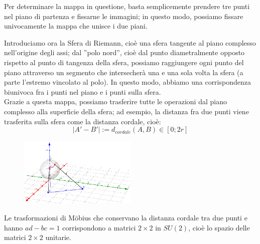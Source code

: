 Per determinare la mappa in questione, basta semplicemente prendere tre punti nel piano di partenza e fissarne le immagini; in questo modo, possiamo fissare univocamente la mappa che unisce i due piani.

Introduciamo ora la Sfera di Riemann, cioè una sfera tangente al piano complesso nell'origine degli assi; dal ''polo nord'', cioè dal punto diametralmente opposto rispetto al punto di  tangenza della sfera, possiamo raggiungere ogni punto del piano attraverso un segmento che intersecherà una e una sola volta la sfera (a parte l'estremo vincolato al polo). In questo modo, abbiamo una corrispondenza biunivoca fra i punti nel piano e i punti sulla sfera.\\
Grazie a questa mappa, possiamo trasferire tutte le operazioni dal piano complesso alla superficie della sfera; ad esempio, la distanza fra due punti viene trasferita sulla sfera come la distanza cordale, cioè:
$$|A'-B'|:=d_{cordale}(A,B) \in [0;2r]$$

\begin{figure}[h!]
  \centering
    \includegraphics[width=0.5\textwidth]{immagini/sferariemann.png}
\end{figure}

Le trasformazioni di M\"{o}bius che conservano la distanza cordale tra due punti e hanno $ad-bc=1$ corrispondono a matrici $2 \times 2$ in $SU(2)$, cioè lo spazio delle matrici $2 \times 2$ unitarie.

